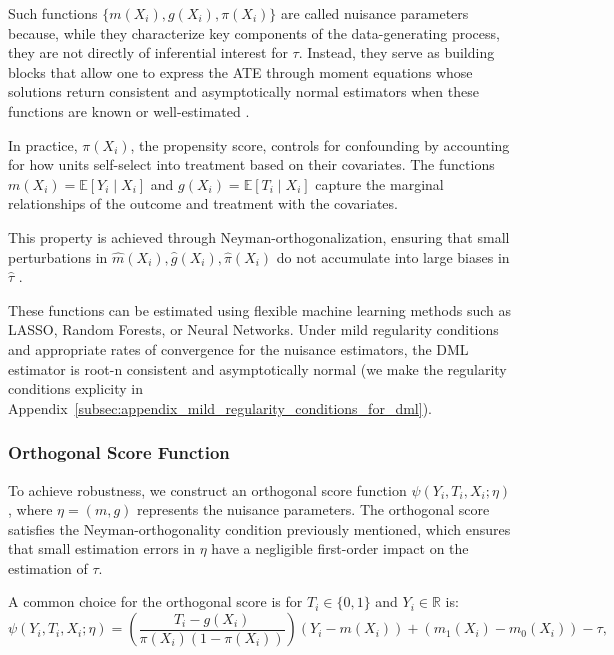 \documentclass{article}
\numberwithin{equation}{section}
\begin{document}
Such functions \(\{m(X_i), g(X_i), \pi(X_i)\}\) are called nuisance parameters because, while they characterize key components of the data-generating process, they are not directly of inferential interest for \(\tau\). Instead, they serve as building blocks that allow one to express the ATE through moment equations whose solutions return consistent and asymptotically normal estimators when these functions are known or well-estimated \cite{Chernozhukov2018, Newey1990, RobinsRotnitzkyZhao1994}.

In practice, \(\pi(X_i)\), the propensity score, controls for confounding by accounting for how units self-select into treatment based on their covariates. The functions \(m(X_i) = \mathbb{E}[Y_i \mid X_i]\) and \(g(X_i) = \mathbb{E}[T_i \mid X_i]\) capture the marginal relationships of the outcome and treatment with the covariates.

This property is achieved through Neyman-orthogonalization, ensuring that small perturbations in \(\hat{m}(X_i), \hat{g}(X_i), \hat{\pi}(X_i)\) do not accumulate into large biases in \(\hat{\tau}\) \cite{Chernozhukov2018, BelloniChernozhukovHansen2014}.

These functions can be estimated using flexible machine learning methods such as LASSO, Random Forests, or Neural Networks. Under mild regularity conditions and appropriate rates of convergence for the nuisance estimators, the DML estimator is root-n consistent and asymptotically normal (we make the regularity conditions explicity in Appendix~\ref{subsec:appendix_mild_regularity_conditions_for_dml}).

\subsubsection{Orthogonal Score Function}

To achieve robustness, we construct an orthogonal score function $\psi(Y_i, T_i, X_i; \eta)$, where $\eta = (m, g)$ represents the nuisance parameters. The orthogonal score satisfies the Neyman-orthogonality condition previously mentioned, which ensures that small estimation errors in $\eta$ have a negligible first-order impact on the estimation of $\tau$.

A common choice for the orthogonal score is for $T_i \in \{0,1\}$ and $Y_i \in \mathbb{R}$ is:
\begin{equation}
\psi(Y_i, T_i, X_i; \eta) = \left( \frac{T_i - g(X_i)}{\pi(X_i)(1 - \pi(X_i))} \right) (Y_i - m(X_i)) + \left( m_1(X_i) - m_0(X_i) \right) - \tau,
\label{eq:orthogonal_score}
\end{equation}
\end{document}
